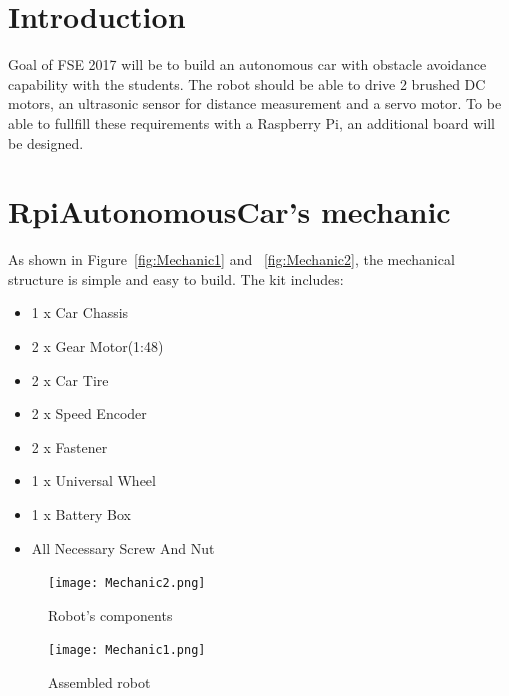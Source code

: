 \documentclass[
12pt, %
a4paper, %
oneside, %
headinclude,footinclude, %
BCOR5mm, %
table,
]{scrartcl}
\begin{document}
%
\newpage
%


\section{Introduction}
Goal of FSE 2017 will be to build an autonomous car with obstacle avoidance capability with the students. The robot should be able to drive 2 brushed DC motors, an ultrasonic sensor for distance measurement and a servo motor. To be able to fullfill these requirements with a Raspberry Pi, an additional board will be designed.


\section{RpiAutonomousCar's mechanic}
As shown in Figure~\vref{fig:Mechanic1} and ~\vref{fig:Mechanic2}, the mechanical structure is simple and easy to build. The kit includes:
\begin{itemize}
\item 1 x Car Chassis 
\item 2 x Gear Motor(1:48) 
\item 2 x Car Tire 
\item 2 x Speed Encoder 
\item 2 x Fastener 
\item 1 x Universal Wheel 
\item 1 x Battery Box 
\item All Necessary Screw And Nut
\end{itemize}

\begin{figure}[h]
  \texttt{[image: Mechanic2.png]}
  \caption{Robot's components}\label{fig:Mechanic2}
\endminipage\hfill
{}
  \texttt{[image: Mechanic1.png]}
  \caption{Assembled robot}\label{fig:Mechanic1}
\endminipage
\end{figure}


\end{document}
